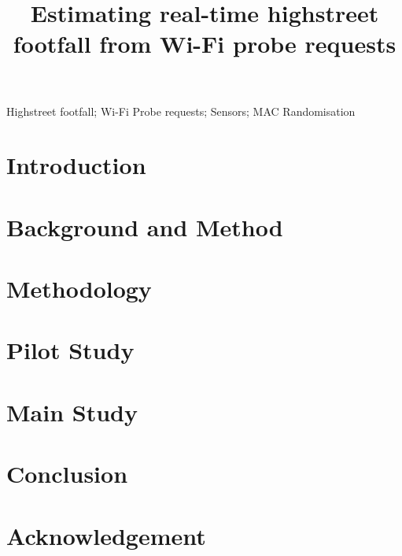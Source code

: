 \documentclass[]{interact}
\theoremstyle{plain}
\theoremstyle{definition}
\theoremstyle{remark}
\begin{document}
	\title{Estimating real-time highstreet footfall from Wi-Fi probe requests}
	\author{
	}
	\maketitle
	\begin{abstract}
		 \end{abstract}
	\begin{keywords}
		Highstreet footfall; Wi-Fi Probe requests; Sensors; MAC Randomisation \end{keywords}
	\section{Introduction}\label{introduction}
		
	\section{Background and Method}\label{previous_work}
		
	\section{Methodology}\label{methodology}
		
	\section{Pilot Study}\label{pilot_study}
		
	\section{Main Study}\label{main_study}
		
	\section{Conclusion}\label{conclusion}
		
	\section*{Acknowledgement}
		
	 
\end{document}
